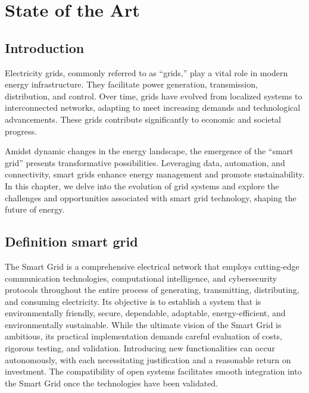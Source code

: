 \chapter{State of the Art} \label{chap:state_of_the_art}


\section*{Introduction}
Electricity grids, commonly referred to as “grids,” play a vital role in modern energy infrastructure. They facilitate power generation, transmission, distribution, and control. Over time, grids have evolved from localized systems to interconnected networks, adapting to meet increasing demands and technological advancements. These grids contribute significantly to economic and societal progress.

Amidst dynamic changes in the energy landscape, the emergence of the “smart grid” presents transformative possibilities. Leveraging data, automation, and connectivity, smart grids enhance energy management and promote sustainability. In this chapter, we delve into the evolution of grid systems and explore the challenges and opportunities associated with smart grid technology, shaping the future of energy.
\newpage


\section{Definition smart grid}
The Smart Grid is a comprehensive electrical network that employs cutting-edge communication technologies, computational intelligence, and cybersecurity protocols throughout the entire process of generating, transmitting, distributing, and consuming electricity. Its objective is to establish a system that is environmentally friendly, secure, dependable, adaptable, energy-efficient, and environmentally sustainable. While the ultimate vision of the Smart Grid is ambitious, its practical implementation demands careful evaluation of costs, rigorous testing, and validation. Introducing new functionalities can occur autonomously, with each necessitating justification and a reasonable return on investment. The compatibility of open systems facilitates smooth integration into the Smart Grid once the technologies have been validated.\cite{gharavi2011smart}


